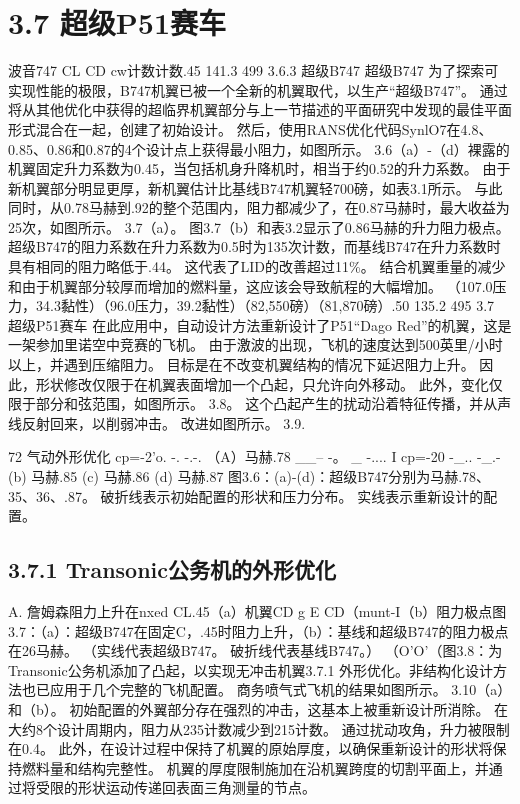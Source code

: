 \documentclass[UTF8,11pt,a4paper,openany,fontset=fandol]{ctexbook}
\begin{document}
\section{3.7 超级P51赛车}
波音747 CL CD cw计数计数.45 141.3 499 3.6.3 超级B747 超级B747 为了探索可实现性能的极限，B747机翼已被一个全新的机翼取代，以生产“超级B747”。 通过将从其他优化中获得的超临界机翼部分与上一节描述的平面研究中发现的最佳平面形式混合在一起，创建了初始设计。 然后，使用RANS优化代码SynlO7在4.8、0.85、0.86和0.87的4个设计点上获得最小阻力，如图所示。 3.6（a）-（d）裸露的机翼固定升力系数为0.45，当包括机身升降机时，相当于约0.52的升力系数。 由于新机翼部分明显更厚，新机翼估计比基线B747机翼轻700磅，如表3.1所示。 与此同时，从0.78马赫到.92的整个范围内，阻力都减少了，在0.87马赫时，最大收益为25次，如图所示。 3.7（a）。 图3.7（b）和表3.2显示了0.86马赫的升力阻力极点。 超级B747的阻力系数在升力系数为0.5时为135次计数，而基线B747在升力系数时具有相同的阻力略低于.44。 这代表了LID的改善超过11\%。 结合机翼重量的减少和由于机翼部分较厚而增加的燃料量，这应该会导致航程的大幅增加。 （107.0压力，34.3黏性）（96.0压力，39.2黏性）（82,550磅）（81,870磅）.50 135.2 495 3.7 超级P51赛车 在此应用中，自动设计方法重新设计了P51“Dago Red”的机翼，这是一架参加里诺空中竞赛的飞机。 由于激波的出现，飞机的速度达到500英里/小时以上，并遇到压缩阻力。 目标是在不改变机翼结构的情况下延迟阻力上升。 因此，形状修改仅限于在机翼表面增加一个凸起，只允许向外移动。 此外，变化仅限于部分和弦范围，如图所示。 3.8。 这个凸起产生的扰动沿着特征传播，并从声线反射回来，以削弱冲击。 改进如图所示。 3.9.

72 气动外形优化 cp=-2'o. -. -.-. （A）马赫.78 \_\_-- -。 \_ -.... I cp=-20 -\_.. -\_.- (b) 马赫.85 (c) 马赫.86 (d) 马赫.87 图3.6：(a)-(d)：超级B747分别为马赫.78、35、36、.87。 破折线表示初始配置的形状和压力分布。 实线表示重新设计的配置。

\subsection{3.7.1 Transonic公务机的外形优化}
A. 詹姆森阻力上升在nxed CL.45（a）机翼CD g E CD（munt-I（b）阻力极点图3.7：（a）：超级B747在固定C，.45时阻力上升，（b）：基线和超级B747的阻力极点在26马赫。 （实线代表超级B747。 破折线代表基线B747。） （O'O'（图3.8：为Transonic公务机添加了凸起，以实现无冲击机翼3.7.1 外形优化。非结构化设计方法也已应用于几个完整的飞机配置。 商务喷气式飞机的结果如图所示。 3.10（a）和（b）。 初始配置的外翼部分存在强烈的冲击，这基本上被重新设计所消除。 在大约8个设计周期内，阻力从235计数减少到215计数。 通过扰动攻角，升力被限制在0.4。 此外，在设计过程中保持了机翼的原始厚度，以确保重新设计的形状将保持燃料量和结构完整性。 机翼的厚度限制施加在沿机翼跨度的切割平面上，并通过将受限的形状运动传递回表面三角测量的节点。
\end{document}

